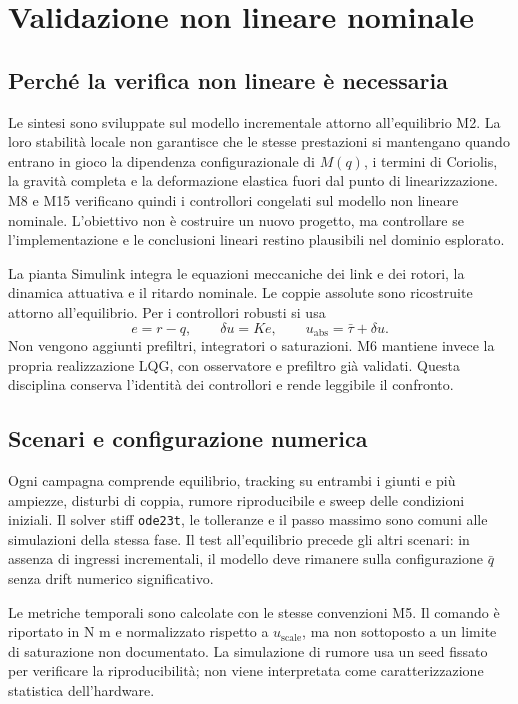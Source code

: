 \chapter{Validazione non lineare nominale}
\section{Perché la verifica non lineare è necessaria}
Le sintesi sono sviluppate sul modello incrementale attorno all'equilibrio M2. La loro stabilità locale non garantisce che le stesse prestazioni si mantengano quando entrano in gioco la dipendenza configurazionale di $M(q)$, i termini di Coriolis, la gravità completa e la deformazione elastica fuori dal punto di linearizzazione. M8 e M15 verificano quindi i controllori congelati sul modello non lineare nominale. L'obiettivo non è costruire un nuovo progetto, ma controllare se l'implementazione e le conclusioni lineari restino plausibili nel dominio esplorato.

La pianta Simulink integra le equazioni meccaniche dei link e dei rotori, la dinamica attuativa e il ritardo nominale. Le coppie assolute sono ricostruite attorno all'equilibrio. Per i controllori robusti si usa
\[
e=r-q,\qquad
\delta u=K e,\qquad
u_{\mathrm{abs}}=\bar\tau+\delta u.
\]
Non vengono aggiunti prefiltri, integratori o saturazioni. M6 mantiene invece la propria realizzazione LQG, con osservatore e prefiltro già validati. Questa disciplina conserva l'identità dei controllori e rende leggibile il confronto.

\section{Scenari e configurazione numerica}
Ogni campagna comprende equilibrio, tracking su entrambi i giunti e più ampiezze, disturbi di coppia, rumore riproducibile e sweep delle condizioni iniziali. Il solver stiff \texttt{ode23t}, le tolleranze e il passo massimo sono comuni alle simulazioni della stessa fase. Il test all'equilibrio precede gli altri scenari: in assenza di ingressi incrementali, il modello deve rimanere sulla configurazione $\bar q$ senza drift numerico significativo.

Le metriche temporali sono calcolate con le stesse convenzioni M5. Il comando è riportato in N m e normalizzato rispetto a $u_{\mathrm{scale}}$, ma non sottoposto a un limite di saturazione non documentato. La simulazione di rumore usa un seed fissato per verificare la riproducibilità; non viene interpretata come caratterizzazione statistica dell'hardware.

